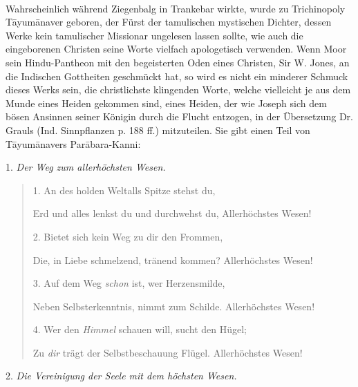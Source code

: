\documentclass{article}
\begin{document}
\paragraph{}
Wahrscheinlich während Ziegenbalg in Trankebar wirkte, wurde zu Trichinopoly T\={a}yum\={a}naver geboren, der Fürst der tamulischen mystischen Dichter, dessen Werke kein tamulischer Missionar ungelesen lassen sollte, wie auch die eingeborenen Christen seine Worte vielfach apologetisch verwenden. Wenn Moor sein Hindu-Pantheon mit den begeisterten Oden eines Christen, Sir W. Jones, an die Indischen Gottheiten geschmückt hat, so wird es nicht ein minderer Schmuck dieses Werks sein, die christlichste klingenden Worte, welche vielleicht je aus dem Munde eines Heiden gekommen sind, eines Heiden, der wie Joseph sich dem bösen Ansinnen seiner Königin durch die Flucht entzogen, in der Übersetzung Dr. Grauls (Ind. Sinnpflanzen p. 188 ff.) mitzuteilen. Sie gibt einen Teil von T\={a}yum\={a}navers Par\={a}bara-Kanni:
\begin{center}
1. \emph{Der Weg zum allerhöchsten Wesen.}
\end{center}
\begin{quotation}\small
1. An des holden Weltalls Spitze stehst du,

Erd und alles lenkst du und durchwehst du, Allerhöchstes Wesen!

\bigskip

2. Bietet sich kein Weg zu dir den Frommen,

Die, in Liebe schmelzend, tränend kommen? Allerhöchstes Wesen!

\bigskip

3. Auf dem Weg \emph{schon} ist, wer Herzensmilde,

Neben Selbsterkenntnis, nimmt zum Schilde. Allerhöchstes Wesen!

\bigskip

4. Wer den \emph{Himmel} schauen will, sucht den Hügel;

Zu \emph{dir} trägt der Selbstbeschauung Flügel. Allerhöchstes Wesen!
\end{quotation}
\begin{center}
2. \emph{Die Vereinigung der Seele mit dem höchsten Wesen.}
\end{center}
\end{document}
